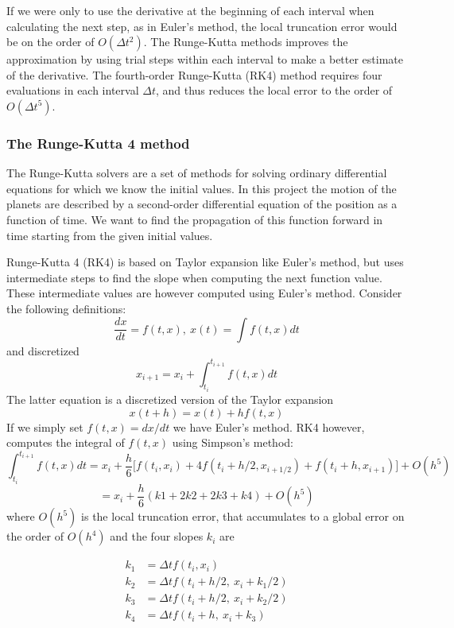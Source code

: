 \documentclass[a4paper,12pt, english]{article}
\begin{document}
If we were only to use the derivative at the beginning of each interval when calculating the next step, as in Euler's method, the local truncation error would be on the order of $O(\Delta t^2)$. The Runge-Kutta methods improves the approximation by using trial steps within each interval to make a better estimate of the derivative. The fourth-order Runge-Kutta (RK4) method requires four evaluations in each interval $\Delta t$, and thus reduces the local error to the order of $O(\Delta t^5)$.

 
\subsubsection*{The Runge-Kutta 4 method}

The Runge-Kutta solvers are a set of methods for solving ordinary differential equations for which we know the initial values. In this project the motion of the planets are described by a second-order differential equation of the position as a function of time. We want to find the propagation of this function forward in time starting from the given initial values.

Runge-Kutta 4 (RK4) is based on Taylor expansion like Euler's method, but uses intermediate steps to find the slope when computing the next function value. These intermediate values are however computed using Euler's method. Consider the following definitions:
\[
\frac{dx}{dt}=f(t,x), \ x(t)=\int f(t,x)dt
\]
and discretized
\[
x_{i+1} = x_i + \int_{t_i}^{t_{i+1}}f(t,x)dt
\]
The latter equation is a discretized version of the Taylor expansion
\[
x(t+h) = x(t) + hf(t,x)
\]
If we simply set $f(t,x) = dx/dt$ we have Euler's method. RK4 however, computes the integral of $f(t,x)$ using Simpson's method:
\[
\int_{t_i}^{t_{i+1}}f(t,x)dt = x_i + \frac{h}{6} \lbrack f(t_i,x_i) + 4f(t_i+h/2,x_{i+1/2}) +
f(t_i+h,x_{i+1}) \rbrack + O(h^5)
\]
\[
= x_i + \frac{h}{6} (k1 + 2k2 + 2k3 + k4) + O(h^5)
\]
where $O(h^5)$ is the local truncation error, that accumulates to a global error on the order of $O(h^4)$ and the four slopes $k_i$ are

\begin{equation}
\begin{split}
k_1 &= \Delta t f(t_i,x_i) \\
k_2 &= \Delta t f(t_i + h/2, \ x_i + k_1/2) \\
k_3 &= \Delta t f(t_i + h/2, \ x_i + k_2/2) \\
k_4 &= \Delta t f(t_i + h, \ x_i + k_3)
\end{split}
\end{equation}
\end{document}
